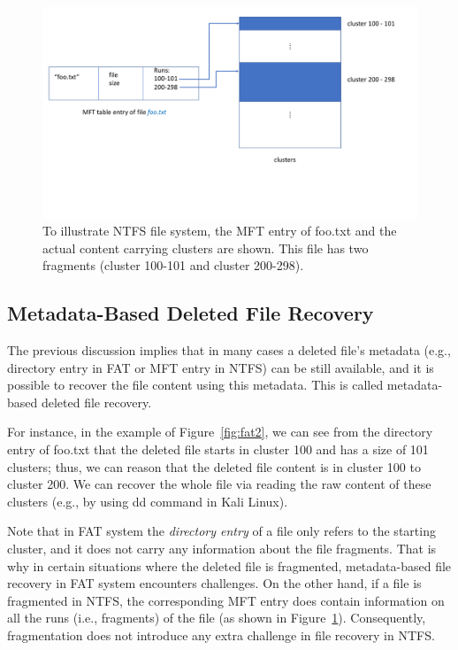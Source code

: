 \begin{figure}[h]
    \centering
    \includegraphics[width=\linewidth]{fig/ntfs.pdf}
    \caption{To illustrate NTFS file system, the MFT entry of foo.txt and the actual content carrying clusters are shown. 
This file has two fragments (cluster 100-101 and cluster 200-298).}
    \label{fig:ntfs}
\end{figure}
\subsection{Metadata-Based Deleted File Recovery}
The previous discussion implies that in many cases a deleted file's metadata 
(e.g., directory entry in FAT or MFT entry in NTFS) can be still available, 
and it is possible to recover the file content using this metadata. 
This is called metadata-based deleted file recovery.

For instance, in the example of Figure~\ref{fig:fat2},
we can see from the directory entry of foo.txt that 
the deleted file starts in cluster 100 and has a size of 101 clusters;
thus, we can reason that the deleted file content is in cluster 100 to cluster 200.
We can recover the whole file via reading the raw content of these clusters (e.g., by using dd command in Kali Linux). 

Note that in FAT system the \emph{directory entry} of a file only refers to the starting cluster, and it does not carry any information about the file fragments.
That is why in certain situations where the deleted file is fragmented, metadata-based file recovery in FAT system encounters challenges.
On the other hand, if a file is fragmented in NTFS, the corresponding MFT entry does contain information on all the runs (i.e., fragments) of the file
(as shown in Figure~\ref{fig:ntfs}). Consequently, fragmentation does not introduce any extra challenge in file recovery in NTFS.


